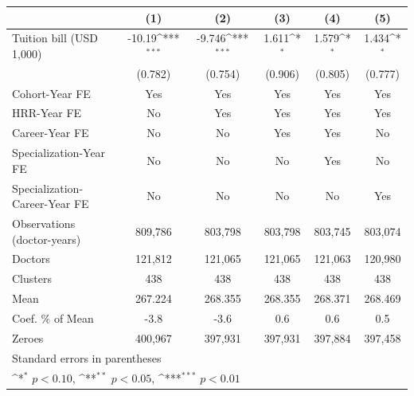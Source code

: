 {
\def\sym#1{\ifmmode^{#1}\else\(^{#1}\)\fi}
\begin{tabular}{l*{5}{c}}
\hline\hline
                    &\multicolumn{1}{c}{(1)}         &\multicolumn{1}{c}{(2)}         &\multicolumn{1}{c}{(3)}         &\multicolumn{1}{c}{(4)}         &\multicolumn{1}{c}{(5)}         \\
\hline
Tuition bill (USD 1,000)&      -10.19\sym{***}&      -9.746\sym{***}&       1.611\sym{*}  &       1.579\sym{*}  &       1.434\sym{*}  \\
                    &     (0.782)         &     (0.754)         &     (0.906)         &     (0.805)         &     (0.777)         \\
[1em]
Cohort-Year FE      &         Yes         &         Yes         &         Yes         &         Yes         &         Yes         \\
[1em]
HRR-Year FE         &          No         &         Yes         &         Yes         &         Yes         &         Yes         \\
[1em]
Career-Year FE      &          No         &          No         &         Yes         &         Yes         &          No         \\
[1em]
Specialization-Year FE&          No         &          No         &          No         &         Yes         &          No         \\
[1em]
Specialization-Career-Year FE&          No         &          No         &          No         &          No         &         Yes         \\
\hline
Observations (doctor-years)&     809,786         &     803,798         &     803,798         &     803,745         &     803,074         \\
Doctors             &     121,812         &     121,065         &     121,065         &     121,063         &     120,980         \\
Clusters            &         438         &         438         &         438         &         438         &         438         \\
Mean                &     267.224         &     268.355         &     268.355         &     268.371         &     268.469         \\
Coef. \% of Mean    &        -3.8         &        -3.6         &         0.6         &         0.6         &         0.5         \\
Zeroes              &     400,967         &     397,931         &     397,931         &     397,884         &     397,458         \\
\hline\hline
\multicolumn{6}{l}{\footnotesize Standard errors in parentheses}\\
\multicolumn{6}{l}{\footnotesize \sym{*} \(p<0.10\), \sym{**} \(p<0.05\), \sym{***} \(p<0.01\)}\\
\end{tabular}
}
